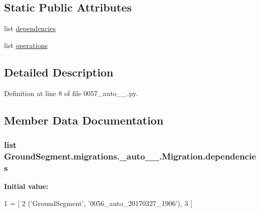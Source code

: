 \subsection*{Static Public Attributes}
\begin{DoxyCompactItemize}
\item 
list \hyperlink{class_ground_segment_1_1migrations_1_10057__auto__20170327__1907_1_1_migration_a8e352bebe90742f5854b40d769fe7378}{dependencies}
\item 
list \hyperlink{class_ground_segment_1_1migrations_1_10057__auto__20170327__1907_1_1_migration_a6cb9f99f2667d3df18fe10d9d6fd87eb}{operations}
\end{DoxyCompactItemize}


\subsection{Detailed Description}


Definition at line 8 of file 0057\+\_\+auto\+\_\+\_.\+py.



\subsection{Member Data Documentation}
\hypertarget{class_ground_segment_1_1migrations_1_10057__auto__20170327__1907_1_1_migration_a8e352bebe90742f5854b40d769fe7378}{}
\subsubsection[{dependencies}]{\setlength{\rightskip}{0pt plus 5cm}list Ground\+Segment.\+migrations.\+\_\+auto\+\_\+\_.\+Migration.\+dependencies\hspace{0.3cm}{\ttfamily [static]}}\label{class_ground_segment_1_1migrations_1_10057__auto__20170327__1907_1_1_migration_a8e352bebe90742f5854b40d769fe7378}
{\bfseries Initial value\+:}
\begin{DoxyCode}
1 = [
2         (\textcolor{stringliteral}{'GroundSegment'}, \textcolor{stringliteral}{'0056\_auto\_20170327\_1906'}),
3     ]
\end{DoxyCode}


